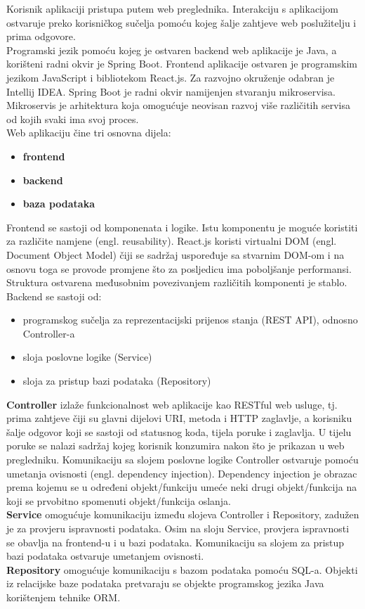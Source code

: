 	Korisnik aplikaciji pristupa putem web preglednika. Interakciju s aplikacijom ostvaruje preko korisničkog sučelja pomoću kojeg šalje zahtjeve web poslužitelju i prima odgovore.\\
Programski jezik pomoću kojeg je ostvaren backend web aplikacije je Java, a korišteni radni okvir je Spring Boot. Frontend aplikacije ostvaren je programskim jezikom JavaScript i bibliotekom React.js. Za razvojno okruženje odabran je Intellij IDEA. Spring Boot je radni okvir namijenjen stvaranju mikroservisa. Mikroservis je arhitektura koja omogućuje neovisan razvoj više različitih servisa od kojih svaki ima svoj proces.\\
Web aplikaciju čine tri osnovna dijela:
	\begin{itemize}
		\item 	\textbf{frontend}
		\item 	\textbf{backend}
		\item 	\textbf{baza podataka }		
	\end{itemize}
Frontend se sastoji od komponenata i logike. Istu komponentu je moguće koristiti za različite namjene (engl. reusability). React.js koristi virtualni DOM (engl. Document Object Model) čiji se sadržaj uspoređuje sa stvarnim DOM-om i na osnovu toga se provode promjene što za posljedicu ima poboljšanje performansi. Struktura ostvarena međusobnim povezivanjem različitih komponenti je stablo.\\
Backend se sastoji od: 
\begin{itemize}
		\item 	programskog sučelja za reprezentacijski prijenos stanja (REST API), odnosno Controller-a
		\item 	sloja poslovne logike (Service)
		\item 	sloja za pristup bazi podataka (Repository)		
	\end{itemize}
\textbf{Controller} izlaže funkcionalnost web aplikacije kao RESTful web usluge, tj. prima zahtjeve čiji su glavni dijelovi URI, metoda i HTTP zaglavlje, a korisniku šalje odgovor koji se sastoji od statusnog koda, tijela poruke i zaglavlja. U tijelu poruke se nalazi sadržaj kojeg korisnik konzumira nakon što je prikazan u web pregledniku. Komunikaciju sa slojem poslovne logike Controller ostvaruje pomoću umetanja ovisnosti (engl. dependency injection). Dependency injection je obrazac prema kojemu se u određeni objekt/funkciju umeće neki drugi objekt/funkcija na koji se prvobitno spomenuti objekt/funkcija oslanja.\\
\textbf{Service} omogućuje komunikaciju između slojeva Controller i Repository, zadužen je za provjeru ispravnosti podataka. Osim na sloju Service, provjera ispravnosti se obavlja na frontend-u i u bazi podataka. Komunikaciju sa slojem za pristup bazi podataka ostvaruje umetanjem ovisnosti.\\ 
\textbf{Repository} omogućuje komunikaciju s bazom podataka pomoću SQL-a. Objekti iz relacijske baze podataka pretvaraju se objekte programskog jezika Java korištenjem tehnike ORM.\\\\
		

